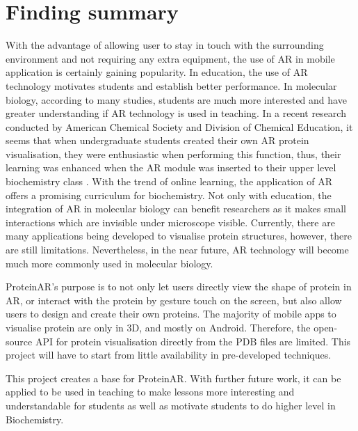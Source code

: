 \section{Finding summary}
With the advantage of allowing user to stay in touch with the surrounding environment and not requiring any extra equipment, the use of AR in mobile application is certainly gaining popularity. In education, the use of AR technology motivates students and establish better performance. In molecular biology, according to many studies, students are much more interested and have greater understanding if AR technology is used in teaching. In a recent research conducted by American Chemical Society and Division of Chemical Education, it seems that when undergraduate students created their own AR protein visualisation, they were enthusiastic when performing this function, thus, their learning was enhanced when the AR module was inserted to their upper level biochemistry class \parencite{argu_fast_2020}. With the trend of online learning, the application of AR offers a promising curriculum for biochemistry.
Not only with education, the integration of AR in molecular biology can benefit researchers as it makes small interactions which are invisible under microscope visible. Currently, there are many applications being developed to visualise protein structures, however, there are still limitations. Nevertheless, in the near future, AR technology will become much more commonly used in molecular biology.

ProteinAR’s purpose is to not only let users directly view the shape of protein in AR, or interact with the protein by gesture touch on the screen, but also allow users to design and create their own proteins.
The majority of mobile apps to visualise protein are only in 3D, and mostly on Android. Therefore, the open-source API for protein visualisation directly from the PDB files are limited. This project will have to start from little availability in pre-developed techniques.

This project creates a base for ProteinAR. With further future work, it can be applied to be used in teaching to make lessons more interesting and understandable for students as well as motivate students to do higher level in Biochemistry. 




